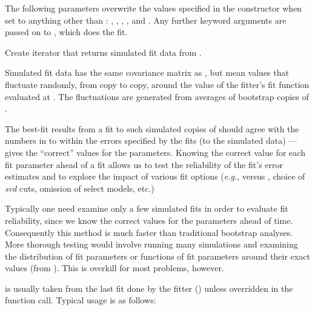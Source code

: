 \documentclass[letterpaper,10pt,english]{sphinxmanual}
\begin{document}
\begin{fulllineitems}
\begin{fulllineitems}
The following parameters overwrite the values specified in the
{\hyperref[corrfitter:corrfitter.CorrFitter]{}} constructor when set to anything other than :
, , , , and . Any
further keyword arguments are passed on to
, which does the fit.

\end{fulllineitems}


\begin{fulllineitems}
\label{corrfitter:corrfitter.CorrFitter.simulated_data_iter}
Create iterator that returns simulated fit data from .

Simulated fit data has the same covariance matrix as 
, but mean values that 
fluctuate randomly, from copy to copy, around
the value of the fitter's fit function evaluated at . 
The fluctuations are generated from averages of bootstrap copies
of .

The best-fit results from a fit to such simulated copies of   
should agree with the numbers in  to within the errors specified
by the fits (to the simulated data) ---  gives the ``correct'' 
values for the parameters. Knowing the correct value for each 
fit parameter ahead of a fit allows us to test the reliability of
the fit's error estimates and to explore the impact of various fit 
options (\emph{e.g.},  versus , 
choice of \emph{svd} cuts, omission of select models, etc.)

Typically one need examine only a few simulated fits in order 
to evaluate fit reliability, since we know the correct values
for the parameters ahead of time. Consequently this method is
much faster than traditional bootstrap analyses. More 
thorough testing would involve running many simulations and
examining the distribution of fit parameters or functions 
of fit parameters around their exact values (from ). 
This is overkill for most problems, however.

 is usually taken from the last fit done by the fitter 
() unless overridden in the function call.
Typical usage is as follows:


\end{fulllineitems}
\end{fulllineitems}
\end{document}
